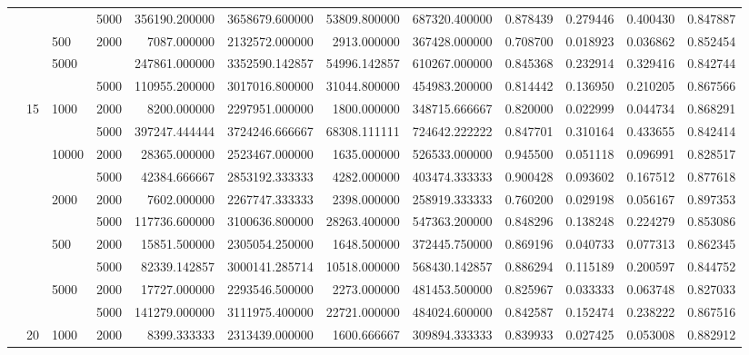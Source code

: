 \begin{tabular}{llllrrrrrrrr}
     &    &      & 5000 &  356190.200000 &  3658679.600000 &  53809.800000 &  687320.400000 &   0.878439 &  0.279446 &  0.400430 &  0.847887 \\
     &    & 500 & 2000 &    7087.000000 &  2132572.000000 &   2913.000000 &  367428.000000 &   0.708700 &  0.018923 &  0.036862 &  0.852454 \\
     &    & 5000 &      &  247861.000000 &  3352590.142857 &  54996.142857 &  610267.000000 &   0.845368 &  0.232914 &  0.329416 &  0.842744 \\
     &    &      & 5000 &  110955.200000 &  3017016.800000 &  31044.800000 &  454983.200000 &   0.814442 &  0.136950 &  0.210205 &  0.867566 \\
     & 15 & 1000 & 2000 &    8200.000000 &  2297951.000000 &   1800.000000 &  348715.666667 &   0.820000 &  0.022999 &  0.044734 &  0.868291 \\
     &    &      & 5000 &  397247.444444 &  3724246.666667 &  68308.111111 &  724642.222222 &   0.847701 &  0.310164 &  0.433655 &  0.842414 \\
     &    & 10000 & 2000 &   28365.000000 &  2523467.000000 &   1635.000000 &  526533.000000 &   0.945500 &  0.051118 &  0.096991 &  0.828517 \\
     &    &      & 5000 &   42384.666667 &  2853192.333333 &   4282.000000 &  403474.333333 &   0.900428 &  0.093602 &  0.167512 &  0.877618 \\
     &    & 2000 & 2000 &    7602.000000 &  2267747.333333 &   2398.000000 &  258919.333333 &   0.760200 &  0.029198 &  0.056167 &  0.897353 \\
     &    &      & 5000 &  117736.600000 &  3100636.800000 &  28263.400000 &  547363.200000 &   0.848296 &  0.138248 &  0.224279 &  0.853086 \\
     &    & 500 & 2000 &   15851.500000 &  2305054.250000 &   1648.500000 &  372445.750000 &   0.869196 &  0.040733 &  0.077313 &  0.862345 \\
     &    &      & 5000 &   82339.142857 &  3000141.285714 &  10518.000000 &  568430.142857 &   0.886294 &  0.115189 &  0.200597 &  0.844752 \\
     &    & 5000 & 2000 &   17727.000000 &  2293546.500000 &   2273.000000 &  481453.500000 &   0.825967 &  0.033333 &  0.063748 &  0.827033 \\
     &    &      & 5000 &  141279.000000 &  3111975.400000 &  22721.000000 &  484024.600000 &   0.842587 &  0.152474 &  0.238222 &  0.867516 \\
     & 20 & 1000 & 2000 &    8399.333333 &  2313439.000000 &   1600.666667 &  309894.333333 &   0.839933 &  0.027425 &  0.053008 &  0.882912 \\

\end{tabular}
